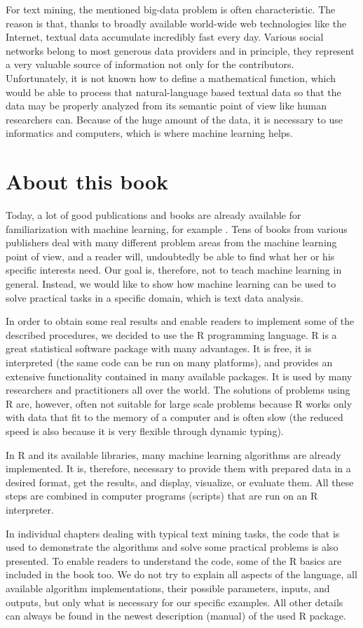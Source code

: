 For text mining, the mentioned big-data problem is often characteristic. The
reason is that, thanks to broadly available world-wide web technologies like the
Internet, textual data accumulate incredibly fast every day. Various social networks belong to most generous data providers and in principle, they represent
a very valuable source of information not only for the contributors. Unfortunately, it is not known how to define a mathematical function, which would be
able to process that natural-language based textual data so that the data may be
properly analyzed from its semantic point of view like human researchers can.
Because of the huge amount of the data, it is necessary to use informatics and
computers, which is where machine learning helps.

\section{About this book}

Today, a lot of good publications and books are already available for familiarization with machine learning, for example \cite{ref199, ref152, ref187, ref261}. Tens of books
from various publishers deal with many different problem areas from the machine learning point of view, and a reader will, undoubtedly be able to find what
her or his specific interests need. Our goal is, therefore, not to teach machine learning in general. Instead, we would like to show how machine learning can be
used to solve practical tasks in a specific domain, which is text data analysis.

In order to obtain some real results and enable readers to implement some
of the described procedures, we decided to use the R programming language.
R is a great statistical software package with many advantages. It is free, it is
interpreted (the same code can be run on many platforms), and provides an extensive functionality contained in many available packages. It is used by many
researchers and practitioners all over the world. The solutions of problems using
R are, however, often not suitable for large scale problems because R works only
with data that fit to the memory of a computer and is often slow (the reduced
speed is also because it is very flexible through dynamic typing).

In R and its available libraries, many machine learning algorithms are already
implemented. It is, therefore, necessary to provide them with prepared data in
a desired format, get the results, and display, visualize, or evaluate them. All
these steps are combined in computer programs (scripts) that are run on an R
interpreter.

In individual chapters dealing with typical text mining tasks, the code that
is used to demonstrate the algorithms and solve some practical problems is also
presented. To enable readers to understand the code, some of the R basics are
included in the book too. We do not try to explain all aspects of the language,
all available algorithm implementations, their possible parameters, inputs, and
outputs, but only what is necessary for our specific examples. All other details
can always be found in the newest description (manual) of the used R package.
